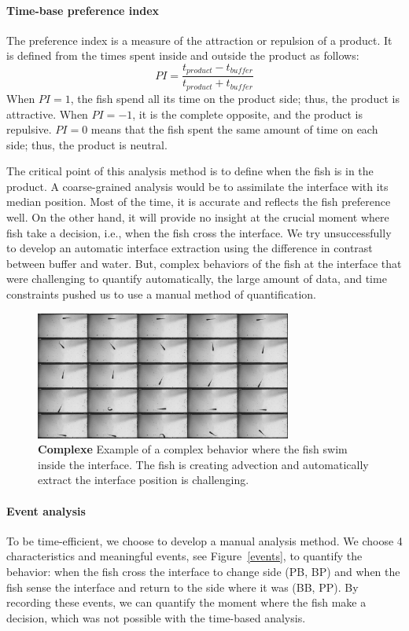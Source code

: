   \paragraph{Time-base preference index} The preference index is a measure of the attraction or repulsion of a product. It is defined from the times spent inside and outside the product as follows:
  $$
  PI=\frac{t_{product}-t_{buffer}}{t_{product}+t_{buffer}}
  $$
  \noindent When $PI=1$, the fish spend all its time on the product side; thus, the product is attractive. When $PI=-1$, it is the complete opposite, and the product is repulsive. $PI=0$ means that the fish spent the same amount of time on each side; thus, the product is neutral.

  The critical point of this analysis method is to define when the fish is in the product. A coarse-grained analysis would be to assimilate the interface with its median position. Most of the time, it is accurate and reflects the fish preference well. On the other hand, it will provide no insight at the crucial moment where fish take a decision, i.e., when the fish cross the interface. We try unsuccessfully to develop an automatic interface extraction using the difference in contrast between buffer and water. But, complex behaviors of the fish at the interface that were challenging to quantify automatically, the large amount of data, and time constraints pushed us to use a manual method of quantification.

    \begin{figure}[h]
      \centering
      \includegraphics[width=0.75\textwidth]{part_2/assets/behavior.jpg}
      \caption{\textbf{Complexe} Example of a complex behavior where the fish swim inside the interface. The fish is creating advection and automatically extract the interface position is challenging.}
      \label{behavior_comp}
    \end{figure}

  \paragraph{Event analysis} To be time-efficient, we choose to develop a manual analysis method. We choose 4 characteristics and meaningful events, see Figure~\ref{events}, to quantify the behavior: when the fish cross the interface to change side (PB, BP) and when the fish sense the interface and return to the side where it was (BB, PP). By recording these events, we can quantify the moment where the fish make a decision, which was not possible with the time-based analysis.


